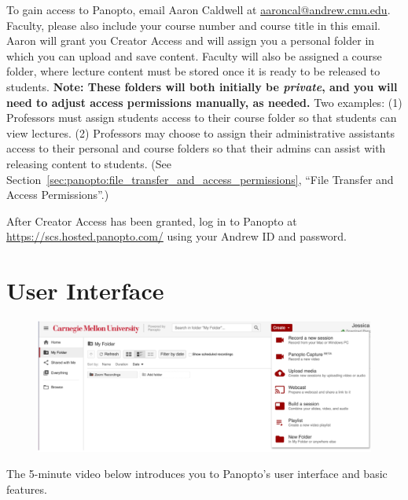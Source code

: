 To gain access to Panopto, email Aaron Caldwell at \href{mailto:aaroncal@andrew.cmu.edu?subject=Creator Access}{aaroncal@andrew.cmu.edu}. Faculty, please also include your course number and course title in this email. Aaron will grant you Creator Access and will assign you a personal folder in which you can upload and save content. Faculty will also be assigned a course folder, where lecture content must be stored once it is ready to be released to students. \textbf{Note: These folders will both initially be \emph{private}, and you will need to adjust access permissions manually, as needed.} Two examples: (1) Professors must assign students access to their course folder so that students can view lectures. (2) Professors may choose to assign their administrative assistants access to their personal and course folders so that their admins can assist with releasing content to students. (See Section~\ref{sec:panopto:file_transfer_and_access_permissions}, ``File Transfer and Access Permissions''.)

After Creator Access has been granted, log in to Panopto at \href{https://scs.hosted.panopto.com/}{https://scs.hosted.panopto.com/} using your Andrew ID and password.


\section{User Interface}
\label{sec:panopto:user_interface}

\begin{gram}
	\begin{figure}[H]
		\centering
		\includegraphics[scale=0.5]{panopto/media/01-ui.png}
	\end{figure}

	The 5-minute video below introduces you to Panopto’s user interface and basic features.

\end{gram}


